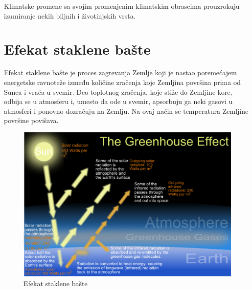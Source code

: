 \documentclass[a4paper]{article}
\begin{document}
Klimatske promene sa svojim promenjenim klimatskim obrascima prouzrokuju izumiranje nekih biljnih i životinjskih vrsta. 

\section{Efekat staklene bašte}	
\label{sec:efekat_staklene_baste}
Efekat staklene bašte je proces zagrevanja Zemlje koji je nastao poremećajem energetske ravnoteže između količine zračenja koje Zemljina površina prima od Sunca i vraća u svemir. Deo toplotnog zračenja, koje stiže do Zemljine kore, odbija se u atmosferu i, umesto da ode u svemir, apsorbuju ga neki gasovi u atmosferi i ponovno dozračuju na Zemlju. Na ovaj način se temperatura Zemljine površine povišava.

\begin{figure}[!ht]
\begin{center}
\includegraphics[scale=0.26]{slika3.png}
\end{center}
\caption{Efekat staklene bašte}
\label{fig:efekat}
\end{figure}
\end{document}

